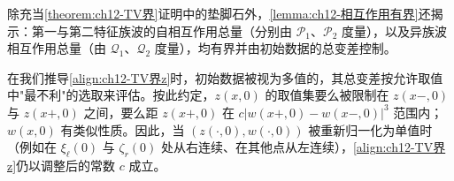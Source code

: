 \documentclass[../../main.tex]{subfiles}
\begin{document}
除充当\cref{theorem:ch12-TV界}证明中的垫脚石外，\cref{lemma:ch12-相互作用有界}还揭示：第一与第二特征族波的自相互作用总量（分别由 $\mathscr{P}_1$、$\mathscr{P}_2$ 度量），以及异族波相互作用总量（由 $\mathscr{Q}_1$、$\mathscr{Q}_2$ 度量），均有界并由初始数据的总变差控制。

在我们推导\eqref{align:ch12-TV界z}时，初始数据被视为多值的，其总变差按允许取值中"最不利"的选取来评估。按此约定，$z(x,0)$ 的取值集要么被限制在 $z(x-,0)$ 与 $z(x+,0)$ 之间，要么距 $z(x+,0)$ 在 $c|w(x+,0)-w(x-,0)|^3$ 范围内；$w(x,0)$ 有类似性质。因此，当 $(z(\cdot,0),w(\cdot,0))$ 被重新归一化为单值时（例如在 $\xi_\ell(0)$ 与 $\zeta_r(0)$ 处从右连续、在其他点从左连续），\eqref{align:ch12-TV界z}仍以调整后的常数 $c$ 成立。
\end{document}
